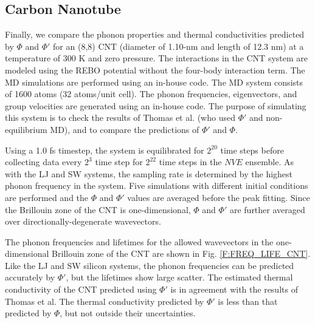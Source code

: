 \documentclass[aps,prb,preprint,superscriptaddress,amsmath,amssymb,floatfix]{revtex4}
\begin{document}
\subsection{\label{S:Subsection_prop_CNT}Carbon Nanotube}

Finally, we compare the phonon properties and thermal conductivities predicted by $\Phi$ and $\Phi'$ for an (8,8) CNT (diameter of 1.10-nm and length of 12.3 nm) at a temperature of $300$ K and zero pressure.\cite{thomas2010c} The interactions in the CNT system are modeled using the REBO potential without the four-body interaction term.\cite{brenner2002} The MD simulations are performed using an in-house code. The MD system consists of 1600 atoms (32 atoms/unit cell). The phonon frequencies, eigenvectors, and group velocities are generated using an in-house code. The purpose of simulating this system is to check the results of Thomas et al.\cite{thomas2010c} (who used $\Phi'$ and non-equilibrium MD), and to compare the predictions of $\Phi'$ and $\Phi$.

Using a 1.0 fs timestep, the system is equilibrated for $2^{20}$ time steps before collecting data every $2^3$ time step for $2^{22}$ time steps in the $NVE$ ensemble.\cite{mcquarrie2000} As with the LJ and SW systems, the sampling rate is determined by the highest phonon frequency in the system. Five simulations with different initial conditions are performed and the $\Phi$ and $\Phi'$ values are averaged before the peak fitting. Since the Brillouin zone of the CNT is one-dimensional, $\Phi$ and $\Phi'$ are further averaged over directionally-degenerate wavevectors.

The phonon frequencies and lifetimes for the allowed wavevectors in the one-dimensional Brillouin zone of the CNT are shown in Fig. \ref{F:FREQ_LIFE_CNT}. Like the LJ and SW silicon systems, the phonon frequencies can be predicted accurately by $\Phi'$, but the lifetimes show large scatter. The estimated thermal conductivity of the CNT predicted using $\Phi'$ is in agreement with the results of Thomas et al.\cite{thomas2010c} The thermal conductivity predicted by $\Phi'$ is less than that predicted by $\Phi$, but not outside their uncertainties.
\end{document}
